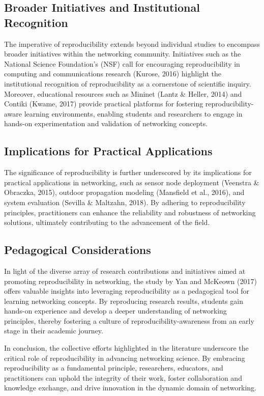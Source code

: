 \documentclass{article}
\begin{document}
\subsection{Broader Initiatives and Institutional Recognition}

The imperative of reproducibility extends beyond individual studies to encompass broader initiatives within the networking community. Initiatives such as the National Science Foundation's (NSF) call for encouraging reproducibility in computing and communications research (Kurose, 2016) highlight the institutional recognition of reproducibility as a cornerstone of scientific inquiry. Moreover, educational resources such as Mininet (Lantz \& Heller, 2014) and Contiki (Kwame, 2017) provide practical platforms for fostering reproducibility-aware learning environments, enabling students and researchers to engage in hands-on experimentation and validation of networking concepts.

\subsection{Implications for Practical Applications}

The significance of reproducibility is further underscored by its implications for practical applications in networking, such as sensor node deployment (Veenstra \& Obraczka, 2015), outdoor propagation modeling (Mansfield et al., 2016), and system evaluation (Sevilla \& Maltzahn, 2018). By adhering to reproducibility principles, practitioners can enhance the reliability and robustness of networking solutions, ultimately contributing to the advancement of the field.

\subsection{Pedagogical Considerations}

In light of the diverse array of research contributions and initiatives aimed at promoting reproducibility in networking, the study by Yan and McKeown (2017) offers valuable insights into leveraging reproducibility as a pedagogical tool for learning networking concepts. By reproducing research results, students gain hands-on experience and develop a deeper understanding of networking principles, thereby fostering a culture of reproducibility-awareness from an early stage in their academic journey.

In conclusion, the collective efforts highlighted in the literature underscore the critical role of reproducibility in advancing networking science. By embracing reproducibility as a fundamental principle, researchers, educators, and practitioners can uphold the integrity of their work, foster collaboration and knowledge exchange, and drive innovation in the dynamic domain of networking.
\end{document}
